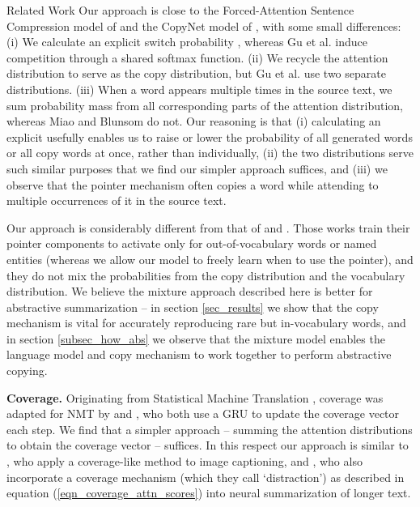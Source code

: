 \documentclass[11pt,a4paper]{article}
\begin{document}
\begin{section}{Related Work}
Our approach is close to the Forced-Attention Sentence Compression model of \citeauthor{miao2016language}  and the CopyNet model of \citeauthor{gu2016incorporating} , with some small differences:
(i) We calculate an explicit switch probability , whereas Gu et al. induce competition through a shared softmax function.
(ii) We recycle the attention distribution to serve as the copy distribution, but Gu et al. use two separate distributions.
(iii) When a word appears multiple times in the source text, we sum probability mass from all corresponding parts of the attention distribution, whereas Miao and Blunsom do not.
Our reasoning is that (i) calculating an explicit  usefully enables us to raise or lower the probability of all generated words or all copy words at once, rather than individually, (ii) the two distributions serve such similar purposes that we find our simpler approach suffices, and (iii) we observe that the pointer mechanism often copies a word while attending to multiple occurrences of it in the source text.

Our approach is considerably different from that of
\citet{gulcehre2016pointing} and \citet{nallapati2016abstractive}.
Those works train their pointer components to activate only for out-of-vocabulary words or named entities (whereas we allow our model to freely learn when to use the pointer), and they do not mix the probabilities from the copy distribution and the vocabulary distribution.
We believe the mixture approach described here is better for abstractive summarization -- in section \ref{sec_results} we show that the copy mechanism is vital for accurately reproducing rare but in-vocabulary words, and in section \ref{subsec_how_abs} we observe that the mixture model enables the language model and copy mechanism to work together to perform abstractive copying.

\textbf{Coverage.}
Originating from Statistical Machine Translation \cite{koehn2009statistical}, coverage was adapted for NMT by \citeauthor{tu2016modeling}  and \citeauthor{mi2016coverage} , who both use a GRU to update the coverage vector each step.
We find that a simpler approach -- summing the attention distributions to obtain the coverage vector -- suffices.
In this respect our approach is similar to \citeauthor{xu2015show} , who apply a coverage-like method to image captioning,
and \citeauthor{chen2016distraction} , who also incorporate a coverage mechanism (which they call `distraction') as described in equation (\ref{eqn_coverage_attn_scores}) into neural summarization of longer text.


\end{section}
\end{document}
